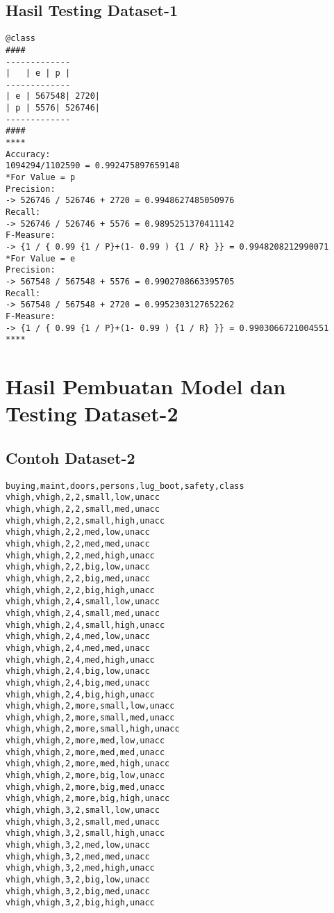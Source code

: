 \subsection{Hasil Testing Dataset-1}
\label{lamp:E-Hasil Testing Dataset-1}
\begin{lstlisting}
@class
####
-------------
|   | e | p |
-------------
| e | 567548| 2720|
| p | 5576| 526746|
-------------
####	
****
Accuracy:
1094294/1102590 = 0.992475897659148
*For Value = p
Precision:
-> 526746 / 526746 + 2720 = 0.9948627485050976
Recall:
-> 526746 / 526746 + 5576 = 0.9895251370411142
F-Measure:
-> {1 / { 0.99 {1 / P}+(1- 0.99 ) {1 / R} }} = 0.9948208212990071
*For Value = e
Precision:
-> 567548 / 567548 + 5576 = 0.9902708663395705
Recall:
-> 567548 / 567548 + 2720 = 0.9952303127652262
F-Measure:
-> {1 / { 0.99 {1 / P}+(1- 0.99 ) {1 / R} }} = 0.9903066721004551
****
\end{lstlisting}


\section{Hasil Pembuatan Model dan Testing Dataset-2}
\label{lamp:E-Hasil Pembuatan Model dan Testing Dataset-2}


\subsection{Contoh Dataset-2}
\label{lamp:E-Contoh Datase1-2}
\begin{lstlisting}
buying,maint,doors,persons,lug_boot,safety,class
vhigh,vhigh,2,2,small,low,unacc
vhigh,vhigh,2,2,small,med,unacc
vhigh,vhigh,2,2,small,high,unacc
vhigh,vhigh,2,2,med,low,unacc
vhigh,vhigh,2,2,med,med,unacc
vhigh,vhigh,2,2,med,high,unacc
vhigh,vhigh,2,2,big,low,unacc
vhigh,vhigh,2,2,big,med,unacc
vhigh,vhigh,2,2,big,high,unacc
vhigh,vhigh,2,4,small,low,unacc
vhigh,vhigh,2,4,small,med,unacc
vhigh,vhigh,2,4,small,high,unacc
vhigh,vhigh,2,4,med,low,unacc
vhigh,vhigh,2,4,med,med,unacc
vhigh,vhigh,2,4,med,high,unacc
vhigh,vhigh,2,4,big,low,unacc
vhigh,vhigh,2,4,big,med,unacc
vhigh,vhigh,2,4,big,high,unacc
vhigh,vhigh,2,more,small,low,unacc
vhigh,vhigh,2,more,small,med,unacc
vhigh,vhigh,2,more,small,high,unacc
vhigh,vhigh,2,more,med,low,unacc
vhigh,vhigh,2,more,med,med,unacc
vhigh,vhigh,2,more,med,high,unacc
vhigh,vhigh,2,more,big,low,unacc
vhigh,vhigh,2,more,big,med,unacc
vhigh,vhigh,2,more,big,high,unacc
vhigh,vhigh,3,2,small,low,unacc
vhigh,vhigh,3,2,small,med,unacc
vhigh,vhigh,3,2,small,high,unacc
vhigh,vhigh,3,2,med,low,unacc
vhigh,vhigh,3,2,med,med,unacc
vhigh,vhigh,3,2,med,high,unacc
vhigh,vhigh,3,2,big,low,unacc
vhigh,vhigh,3,2,big,med,unacc
vhigh,vhigh,3,2,big,high,unacc
\end{lstlisting}

